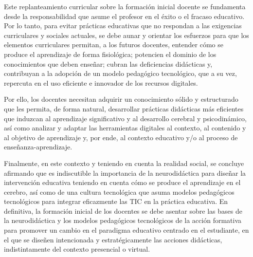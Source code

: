 \documentclass[spanish]{textolivre}
\begin{document}
Este replanteamiento curricular sobre la formación inicial docente se fundamenta desde la responsabilidad que asume el profesor en el éxito o el fracaso educativo. Por lo tanto, para evitar prácticas educativas que no respondan a las exigencias curriculares y sociales actuales, se debe aunar y orientar los esfuerzos para que los elementos curriculares permitan, a los futuros docentes, entender cómo se produce el aprendizaje de forma fisiológica; potencien el dominio de los conocimientos que deben enseñar; cubran las deficiencias didácticas y, contribuyan a la adopción de un modelo pedagógico tecnológico, que a su vez, repercuta en el uso eficiente e innovador de los recursos digitales.

Por ello, los docentes necesitan adquirir un conocimiento sólido y estructurado que les permita, de forma natural, desarrollar prácticas didácticas más eficientes que induzcan al aprendizaje significativo y al desarrollo cerebral y psicodinámico, así como analizar y adaptar las herramientas digitales al contexto, al contenido y al objetivo de aprendizaje y, por ende, al contexto educativo y/o al proceso de enseñanza-aprendizaje.

Finalmente, en este contexto y teniendo en cuenta la realidad social, se concluye afirmando que es indiscutible la importancia de la neurodidáctica para diseñar la intervención educativa teniendo en cuenta cómo se produce el aprendizaje en el cerebro, así como de una cultura tecnológica que asuma modelos pedagógicos tecnológicos para integrar eficazmente las TIC en la práctica educativa. En definitiva, la formación inicial de los docentes se debe asentar sobre las bases de la neurodidáctica y los modelos pedagógicos tecnológicos de la acción formativa para promover un cambio en el paradigma educativo centrado en el estudiante, en el que se diseñen intencionada y estratégicamente las acciones didácticas, indistintamente del contexto presencial o virtual.


\printbibliography\label{sec-bib}
\end{document}
